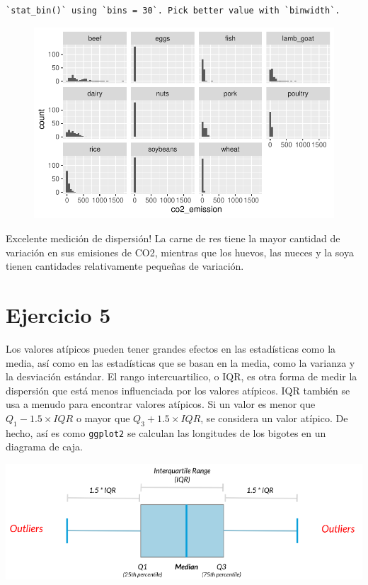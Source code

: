 \documentclass[
  letterpaper,
  DIV=11,
  numbers=noendperiod]{scrreprt}
\begin{document}
\begin{verbatim}
`stat_bin()` using `bins = 30`. Pick better value with `binwidth`.
\end{verbatim}

\begin{figure}[H]

{\centering \includegraphics{intro_files/figure-pdf/unnamed-chunk-36-1.pdf}

}

\end{figure}

Excelente medición de dispersión! La carne de res tiene la mayor
cantidad de variación en sus emisiones de CO2, mientras que los huevos,
las nueces y la soya tienen cantidades relativamente pequeñas de
variación.

\hypertarget{ejercicio-5}{%
\section{Ejercicio 5}\label{ejercicio-5}}

Los valores atípicos pueden tener grandes efectos en las estadísticas
como la media, así como en las estadísticas que se basan en la media,
como la varianza y la desviación estándar. El rango intercuartilico, o
IQR, es otra forma de medir la dispersión que está menos influenciada
por los valores atípicos. IQR también se usa a menudo para encontrar
valores atípicos. Si un valor es menor que \(Q_1 - 1.5\times IQR\) o
mayor que \(Q_3 + 1.5\times IQR\), se considera un valor atípico. De
hecho, así es como \texttt{ggplot2} se calculan las longitudes de los
bigotes en un diagrama de caja.

\includegraphics{fig10.png}
\end{document}
